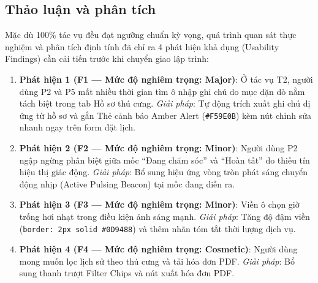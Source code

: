 \subsection{Thảo luận và phân tích}
Mặc dù 100\% tác vụ đều đạt ngưỡng chuẩn kỳ vọng, quá trình quan sát thực nghiệm và phân tích định tính đã chỉ ra 4 phát hiện khả dụng (Usability Findings) cần cải tiến trước khi chuyển giao lập trình:

\begin{enumerate}
  \item \textbf{Phát hiện 1 (F1 --- Mức độ nghiêm trọng: Major)}: Ở tác vụ T2, người dùng P2 và P5 mất nhiều thời gian tìm ô nhập ghi chú do mục dặn dò nằm tách biệt trong tab Hồ sơ thú cưng. \textit{Giải pháp}: Tự động trích xuất ghi chú dị ứng từ hồ sơ và gắn Thẻ cảnh báo Amber Alert (\texttt{\#F59E0B}) kèm nút chỉnh sửa nhanh ngay trên form đặt lịch.
  \item \textbf{Phát hiện 2 (F2 --- Mức độ nghiêm trọng: Minor)}: Người dùng P2 ngập ngừng phân biệt giữa mốc “Đang chăm sóc” và “Hoàn tất” do thiếu tín hiệu thị giác động. \textit{Giải pháp}: Bổ sung hiệu ứng vòng tròn phát sáng chuyển động nhịp (Active Pulsing Beacon) tại mốc đang diễn ra.
  \item \textbf{Phát hiện 3 (F3 --- Mức độ nghiêm trọng: Minor)}: Viền ô chọn giờ trống hơi nhạt trong điều kiện ánh sáng mạnh. \textit{Giải pháp}: Tăng độ đậm viền (\texttt{border: 2px solid \#0D9488}) và thêm nhãn tóm tắt thời lượng dịch vụ.
  \item \textbf{Phát hiện 4 (F4 --- Mức độ nghiêm trọng: Cosmetic)}: Người dùng mong muốn lọc lịch sử theo thú cưng và tải hóa đơn PDF. \textit{Giải pháp}: Bổ sung thanh trượt Filter Chips và nút xuất hóa đơn PDF.
\end{enumerate}
